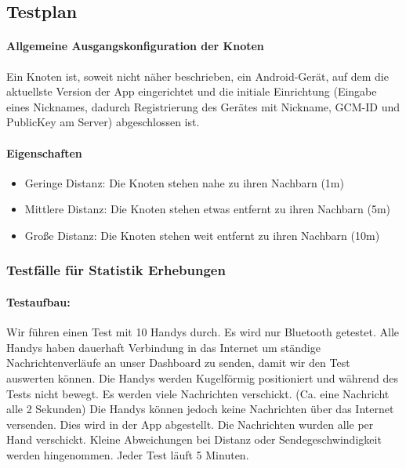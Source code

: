 \subsection{Testplan}

\paragraph{Allgemeine Ausgangskonfiguration der Knoten}

Ein Knoten ist, soweit nicht näher beschrieben, ein Android-Gerät, auf dem die aktuellste Version der App eingerichtet und die initiale Einrichtung (Eingabe eines Nicknames, dadurch Registrierung des Gerätes mit Nickname, GCM-ID und PublicKey am Server) abgeschlossen ist.

\paragraph{Eigenschaften}

\begin{itemize}
  \tightlist
  \item Geringe Distanz: Die Knoten stehen nahe zu ihren Nachbarn (1m)
  \item Mittlere Distanz: Die Knoten stehen etwas entfernt zu ihren Nachbarn (5m)
  \item Große Distanz: Die Knoten stehen weit entfernt zu ihren Nachbarn (10m)
\end{itemize}

\subsubsection{Testfälle für Statistik Erhebungen}\label{Testfaelle}

\paragraph*{Testaufbau:}
Wir führen einen Test mit 10 Handys durch. Es wird nur Bluetooth getestet. Alle Handys haben dauerhaft Verbindung in das Internet um ständige Nachrichtenverläufe an unser Dashboard zu senden, damit wir den Test auswerten können. Die Handys werden Kugelförmig positioniert und
während des Tests nicht bewegt. Es werden viele Nachrichten verschickt. (Ca. eine Nachricht alle 2 Sekunden) Die Handys können jedoch keine Nachrichten über das Internet versenden. Dies wird in der App abgestellt. Die Nachrichten wurden alle per Hand verschickt. Kleine Abweichungen bei Distanz oder Sendegeschwindigkeit werden hingenommen. Jeder Test läuft 5 Minuten. 
